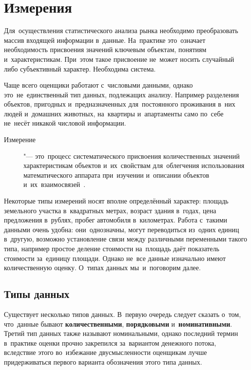\documentclass[]{scrartcl}
\begin{document}
\section{Измерения}
Для~осуществления статистического анализа рынка необходимо преобразовать массив входящей информации в~данные. На~практике это~означает необходимость присвоения значений ключевым объектам, понятиям и~характеристикам. При~этом такое присвоение не~может носить случайный либо субъективный характер. Необходима система.
\par
Чаще всего оценщики работают с~числовыми данными, однако это~не~единственный тип данных, подлежащих анализу. Например разделения объектов, пригодных и~предназначенных для~постоянного проживания в~них людей и~домашних животных, на~квартиры и~апартаменты само по~себе не~несёт никакой числовой информации.
\par
\begin{description}
\item[Измерение] "--- это~процесс систематического присвоения количественных значений характеристикам объектов и~их~свойствам для~облегчения использования математического аппарата при~изучении и~описании объектов и~их~взаимосвязей~\cite{Statistika-dlya-vsex}.
\end{description}
Некоторые типы измерений носят вполне определённый характер: площадь земельного участка в~квадратных метрах, возраст здания в~годах, цена предложения в~рублях, пробег автомобиля в~километрах. Работа с~такими данными очень удобна: они~однозначны, могут переводиться из~одних единиц в~другую, возможно установление связи между различными переменными такого типа, например простое деление стоимости на~площадь даёт показатель стоимости за~единицу площади. Однако не~все данные изначально имеют количественную оценку. О~типах данных мы~и~поговорим далее.
\subsection{Типы данных}
Существует несколько типов данных. В~первую очередь следует сказать о~том, что~данные бывают \textbf{количественными}, \textbf{порядковыми} и~\textbf{номинативными}. Третий тип данных также называют номинальными, однако последний термин в~практике оценки прочно закрепился за~вариантом денежного потока, вследствие этого во~избежание двусмысленности оценщикам лучше придерживаться первого варианта обозначения этого типа данных.
\end{document}
